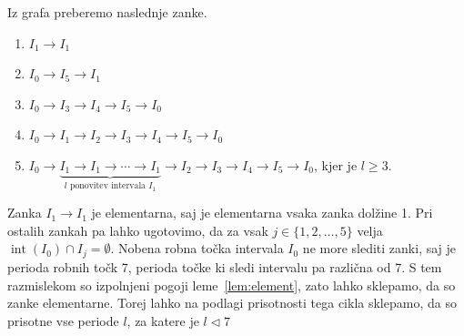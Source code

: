 \documentclass[mat2]{fmfdelo}
\DeclareMathOperator{\interior}{int}
\begin{document}
\begin{primer}[7-cikel]
Iz grafa preberemo naslednje zanke.
\begin{enumerate}
\item $I_1 \to I_1$
\item $I_0 \to I_5 \to I_1$
\item $I_0 \to I_3 \to I_4 \to I_5 \to I_0$
\item $I_0 \to I_1 \to I_2 \to I_3 \to I_4 \to I_5 \to I_0$
\item $I_0 \to \underbrace{I_1 \to I_1 \to \cdots  \to I_1}_{l \text{ ponovitev intervala } I_1} \to I_2 \to I_3 \to I_4 \to I_5 \to I_0$, kjer je $l\geq 3$.
\end{enumerate}
Zanka $I_1 \to I_1$ je elementarna, saj je elementarna vsaka zanka dolžine 1. Pri ostalih zankah pa lahko ugotovimo, da za vsak $j \in \{1, 2, \dots, 5\}$ velja $\interior(I_0) \cap I_j = \emptyset$. Nobena robna točka intervala $I_0$ ne more slediti zanki, saj je perioda robnih točk 7, perioda točke ki sledi intervalu pa različna od 7. S tem razmislekom so izpolnjeni pogoji leme~\ref{lem:element}, zato lahko sklepamo, da so zanke elementarne. Torej lahko na podlagi prisotnosti tega cikla sklepamo, da so prisotne vse periode $l$, za katere je $l \triangleleft 7$
\end{primer}
\end{document}
